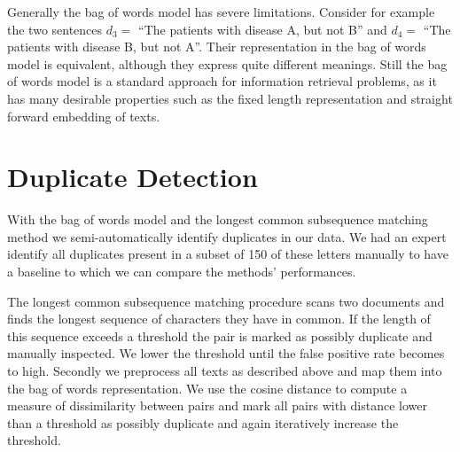 Generally the bag of words model has severe limitations. Consider for example
the two sentences $d_{3}=$ ``The patients with disease A, but not B'' and $d_{4}=$ ``The patients with disease B, but not A''. Their representation in the bag of words model is equivalent,
although they express quite different meanings. Still the bag of words
model is a standard approach for information retrieval problems, as
it has many desirable properties such as the fixed length representation and straight forward embedding of texts.



\section{Duplicate Detection}

With the bag of words model and the longest common subsequence matching method we semi-automatically identify duplicates in our data. We had an expert identify all duplicates present in a subset of 150 of these letters manually to have a baseline to which we can compare the methods' performances.

The longest common subsequence matching procedure scans two documents and finds the longest sequence of characters they have in common. If the length of this sequence exceeds a threshold the pair is marked as possibly duplicate and manually inspected. We lower the threshold until the false positive rate becomes to high. Secondly we preprocess all texts as described above and map them into the bag of words representation. We use the cosine distance to compute a measure of dissimilarity between pairs and mark all pairs with distance lower than a threshold as possibly duplicate and again iteratively increase the threshold.

